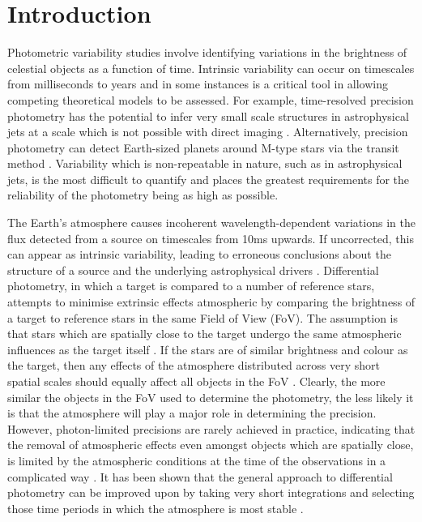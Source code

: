 \documentclass[referee]{aa}
\begin{document}
\maketitle

\section{Introduction}
\label{introduction}

Photometric variability studies involve identifying variations in the brightness of celestial objects as a function of time. Intrinsic variability can occur on timescales from milliseconds to years and in some instances is a critical tool in allowing competing theoretical models to be assessed. For example, time-resolved precision photometry has the potential to infer very small scale structures in astrophysical jets at a scale which is not possible with direct imaging \citep{smith2008emccd}. Alternatively, precision photometry can detect Earth-sized planets around M-type stars via the transit method \citep{giltinan2011using,everett2001technique}.  Variability which is non-repeatable in nature, such as in astrophysical jets, is the most difficult to quantify and places the greatest requirements for the reliability of the photometry being as high as possible. 

The Earth's atmosphere causes incoherent wavelength-dependent variations in the flux detected from a source on timescales from 10ms upwards. If uncorrected, this can appear as intrinsic variability, leading to erroneous conclusions about the structure of a source and the underlying astrophysical drivers \citep{smith2008emccd}. Differential photometry, in which a target is compared to a number of reference stars, attempts to minimise extrinsic effects atmospheric by comparing the brightness of a target to reference stars in the same Field of View (FoV). The assumption is that stars which are spatially close to the target undergo the same atmospheric influences as the target itself \citep{burdanov2014astrokit}. If the stars are of similar brightness and colour as the target, then any effects of the atmosphere distributed across very short spatial scales should equally affect all objects in the FoV \citep{young1991precise,howell2006handbook}. Clearly, the more similar the objects in the FoV used to determine the photometry, the less likely it is that the atmosphere will play a major role in determining the precision. However, photon-limited precisions are rarely achieved in practice, indicating that the removal of atmospheric effects even amongst objects which are spatially close, is limited by the atmospheric conditions at the time of the observations in a complicated way \citep{everett2001technique,howell2002some}.   It has been shown that the general approach to differential photometry can be improved upon by taking very short integrations and selecting those time periods in which the atmosphere is most stable \citep{giltinan2011using}.
\end{document}

